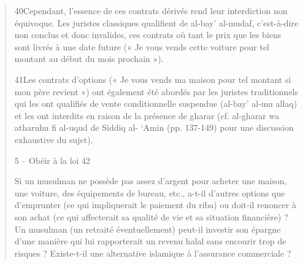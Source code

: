 \begin{quote}
40Cependant, l’essence de ces contrats dérivés rend leur interdiction non équivoque. Les juristes classiques qualifient de al-bay’ al-mudaf, c’est-à-dire non conclus et donc invalides, ces contrats où tant le prix que les biens sont livrés à une date future (« Je vous vends cette voiture pour tel montant au début du mois prochain »).

41Les contrats d’options (« Je vous vends ma maison pour tel montant si mon père revient ») ont également été abordés par les juristes traditionnels qui les ont qualifiés de vente conditionnelle suspendue (al-bay’ al-mu allaq) et les ont interdits en raison de la présence de gharar (cf. al-gharar wa atharuhu fi al-uqud de Siddiq al- ‘Amin (pp. 137-149) pour une discussion exhaustive du sujet).

5 – Obéir à la loi
42

Si un musulman ne possède pas assez d’argent pour acheter une maison, une voiture, des équipements de bureau, etc., a-t-il d’autres options que d’emprunter (ce qui impliquerait le paiement du riba) ou doit-il renoncer à son achat (ce qui affecterait sa qualité de vie et sa situation financière) ?
Un musulman (un retraité éventuellement) peut-il investir son épargne d’une manière qui lui rapporterait un revenu halal sans encourir trop de risques ?
Existe-t-il une alternative islamique à l’assurance commerciale ?\end{quote}
